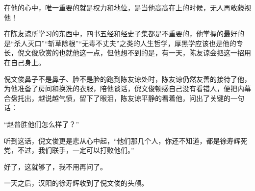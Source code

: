 \begin{multicols}{\theparacolNo}
		在他的心中，唯一重要的就是权力和地位，是当他高高在上的时候，无人再敢藐视他！

		在陈友谅所学习的东西中，四书五经和经史子集都是不重要的，他掌握的最好的是“杀人灭口”“斩草除根”“无毒不丈夫”之类的人生哲学，厚黑学应该也是他的专长，倪文俊欣赏的也就他这一点，但他想不到的是，有一天，陈友谅会把这一招用在自己身上。

		倪文俊鼻子不是鼻子、脸不是脸的跑到陈友谅处时，陈友谅仍然友善的接待了他，为他准备了房间和换洗的衣服，陪他谈话，倪文俊顿感自己没有看错人，便把内幕合盘托出，越说越气愤，留下了眼泪，陈友谅平静的看着他，问出了关键的一句话：

		“赵普胜他们怎么样了？”

		听到这话，倪文俊更是悲从心中起，“他们那几个人，你还不知道，都是徐寿辉死党，不过，我们联手，一定可以打败他们。”

		好了，这就够了，我不用再问了。

		一天之后，汉阳的徐寿辉收到了倪文俊的头颅。
		\ifnum{}
	\end{multicols}
\fi
\newpage
